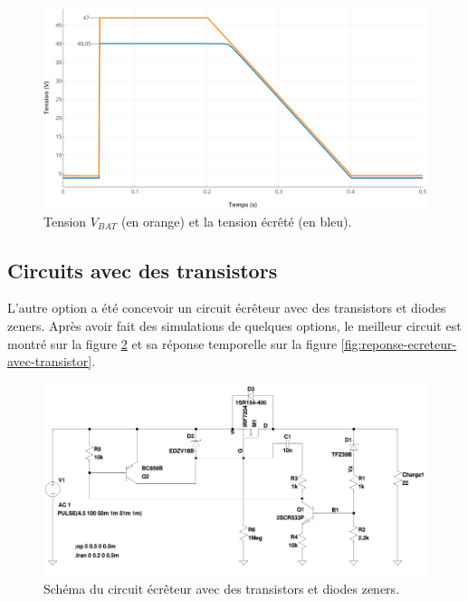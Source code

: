 \begin{figure}[H]
    \centering
    \includegraphics[width=1.00\textwidth]{images/reponse-ecreteur-transil}
    \caption{Tension $V_{BAT}$ (en orange) et la tension écrêté (en bleu).}
    \label{fig:reponse-ecreteur-transil}
\end{figure}



\subsection{Circuits avec des transistors}

L'autre option a été concevoir un circuit écrêteur avec des transistors et diodes zeners. Après avoir fait des simulations de quelques options, le meilleur circuit est montré sur la figure \ref{fig:ecreteur-avec-transistor} et sa réponse temporelle sur la figure \ref{fig:reponse-ecreteur-avec-transistor}.

\begin{figure}[H]
    \centering
    \includegraphics[width=1.00\textwidth]{images/ecreteur-avec-transistor}
    \caption{Schéma du circuit écrêteur avec des transistors et diodes zeners.}
    \label{fig:ecreteur-avec-transistor}
\end{figure}

